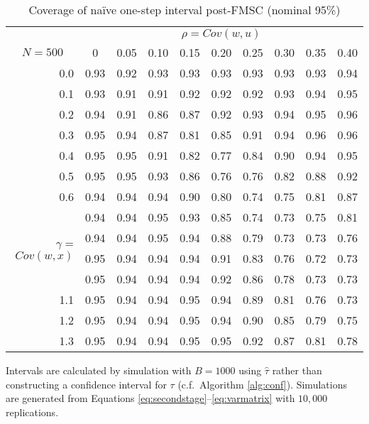 %
\begin{table}[!tbp]
\caption{Coverage of na\"{i}ve one-step interval post-FMSC (nominal 95\%)}
\label{tab:FMSCnaive}
\small
 \begin{center}
 \begin{tabular}{r|rrrrrrrrr}\hline\hline
&\multicolumn{9}{c}{$\rho = Cov(w,u)$}\\
\multicolumn{1}{c|}{$N=500$}&\multicolumn{1}{c}{0}&\multicolumn{1}{c}{0.05}&\multicolumn{1}{c}{0.10}&\multicolumn{1}{c}{0.15}&\multicolumn{1}{c}{0.20}&\multicolumn{1}{c}{0.25}&\multicolumn{1}{c}{0.30}&\multicolumn{1}{c}{0.35}&\multicolumn{1}{c}{0.40}\tabularnewline
\hline
0.0&0.93&0.92&0.93&0.93&0.93&0.93&0.93&0.93&0.94\tabularnewline
0.1&0.93&0.91&0.91&0.92&0.92&0.92&0.93&0.94&0.95\tabularnewline
0.2&0.94&0.91&0.86&0.87&0.92&0.93&0.94&0.95&0.96\tabularnewline
0.3&0.95&0.94&0.87&0.81&0.85&0.91&0.94&0.96&0.96\tabularnewline
0.4&0.95&0.95&0.91&0.82&0.77&0.84&0.90&0.94&0.95\tabularnewline
0.5&0.95&0.95&0.93&0.86&0.76&0.76&0.82&0.88&0.92\tabularnewline
0.6&0.94&0.94&0.94&0.90&0.80&0.74&0.75&0.81&0.87\tabularnewline
\multirow{4}{5mm}{\begin{sideways}\parbox{1mm}{$\gamma\;$=$\;Cov(w,x)$}\end{sideways}}
0.7&0.94&0.94&0.95&0.93&0.85&0.74&0.73&0.75&0.81\tabularnewline
0.8&0.94&0.94&0.95&0.94&0.88&0.79&0.73&0.73&0.76\tabularnewline
0.9&0.95&0.94&0.94&0.94&0.91&0.83&0.76&0.72&0.73\tabularnewline
1.0&0.95&0.94&0.94&0.94&0.92&0.86&0.78&0.73&0.73\tabularnewline
1.1&0.95&0.94&0.94&0.95&0.94&0.89&0.81&0.76&0.73\tabularnewline
1.2&0.95&0.94&0.94&0.95&0.94&0.90&0.85&0.79&0.75\tabularnewline
1.3&0.95&0.94&0.94&0.95&0.95&0.92&0.87&0.81&0.78\tabularnewline
\hline
\end{tabular}
\end{center}
\footnotesize
	\begin{tablenotes}
		\item Intervals are calculated by simulation with $B=1000$ using $\widehat{\tau}$ rather than constructing a confidence interval for $\tau$ (c.f.\ Algorithm \ref{alg:conf}). Simulations are generated from Equations \ref{eq:secondstage}--\ref{eq:varmatrix} with $10,000$ replications.
	\end{tablenotes}
\end{table}
